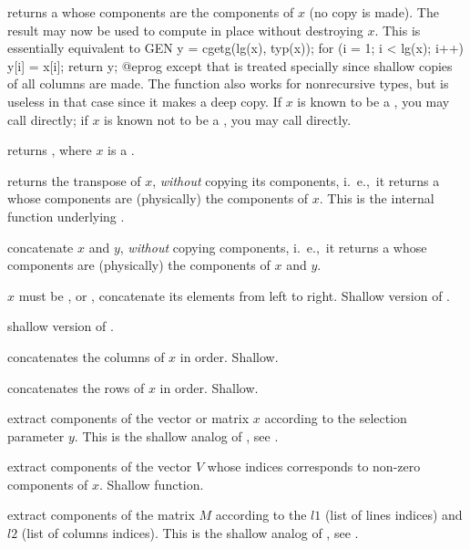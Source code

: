  returns a  whose components are the
components of $x$ (no copy is made). The result may now be used to compute in
place without destroying $x$. This is essentially equivalent to
\bprog
  GEN y = cgetg(lg(x), typ(x));
  for (i = 1; i < lg(x); i++) y[i] = x[i];
  return y;
@eprog\noindent
except that  is treated specially since shallow copies of all columns
are made. The function also works for nonrecursive types, but is useless
in that case since it makes a deep copy. If $x$ is known to be a , you
may call  directly; if $x$ is known not to be a ,
you may call  directly.

 returns , where $x$
is a .

 returns the transpose of $x$, \emph{without}
copying its components, i.~e.,~it returns a  whose components are
(physically) the components of $x$. This is the internal function underlying
.

 concatenate $x$ and $y$, \emph{without}
copying components, i.~e.,~it returns a  whose components are
(physically) the components of $x$ and $y$.

$x$ must be ,  or , concatenate
its elements from left to right. Shallow version of .

 shallow version of .

 concatenates the columns of $x$ in order.
Shallow.

 concatenates the rows of $x$ in order.
Shallow.

 extract components
of the vector or matrix $x$ according to the selection parameter $y$.
This is the shallow analog of , see .

 extract components of
the vector $V$ whose indices corresponds to non-zero components of $x$.
Shallow function.

 extract components of the
matrix $M$ according to the  $l1$ (list of lines indices) and
$l2$ (list of columns indices).
This is the shallow analog of , see .

